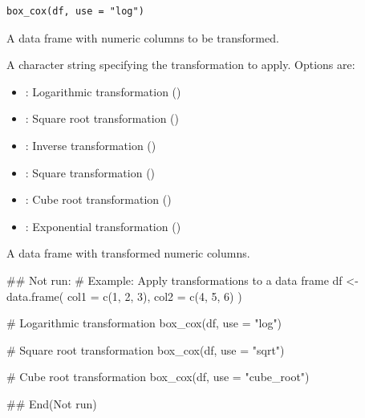 \documentclass[a4paper]{book}
\begin{document}
%
\begin{Usage}
\begin{verbatim}
box_cox(df, use = "log")
\end{verbatim}
\end{Usage}
%
\begin{Arguments}
\begin{ldescription}
\item[\code{df}] A data frame with numeric columns to be transformed.

\item[\code{use}] A character string specifying the transformation to apply. Options are:
\begin{itemize}

\item{} : Logarithmic transformation ()
\item{} : Square root transformation ()
\item{} : Inverse transformation ()
\item{} : Square transformation ()
\item{} : Cube root transformation ()
\item{} : Exponential transformation ()

\end{itemize}

\end{ldescription}
\end{Arguments}
%
\begin{Value}
A data frame with transformed numeric columns.
\end{Value}
%
\begin{Examples}
\begin{ExampleCode}
## Not run: 
# Example: Apply transformations to a data frame
df <- data.frame(
  col1 = c(1, 2, 3),
  col2 = c(4, 5, 6)
)

# Logarithmic transformation
box_cox(df, use = "log")

# Square root transformation
box_cox(df, use = "sqrt")

# Cube root transformation
box_cox(df, use = "cube_root")

## End(Not run)
\end{ExampleCode}
\end{Examples}
\end{document}
